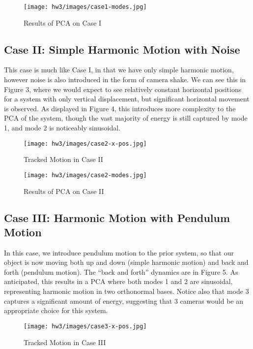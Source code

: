 \documentclass[a4paper,10 pt]{article}
\begin{document}
\begin{figure}[H]
  \centering
    \texttt{[image: hw3/images/case1-modes.jpg]}
    \caption{Results of PCA on Case I}
\end{figure}

\subsection{Case II: Simple Harmonic Motion with Noise}
This case is much like Case I, in that we have only simple harmonic motion, however noise is also introduced in the form of camera shake. We can see this in Figure 3, where we would expect to see relatively constant horizontal positions for a system with only vertical displacement, but significant horizontal movement is observed. As displayed in Figure 4, this introduces more complexity to the PCA of the system, though the vast majority of energy is still captured by mode 1, and mode 2 is noticeably sinusoidal.

\begin{figure}[H]
  \centering
    \texttt{[image: hw3/images/case2-x-pos.jpg]}
    \caption{Tracked Motion in Case II}
\end{figure}

\begin{figure}[H]
  \centering
    \texttt{[image: hw3/images/case2-modes.jpg]}
    \caption{Results of PCA on Case II}
\end{figure}

\subsection{Case III: Harmonic Motion with Pendulum Motion}
In this case, we introduce pendulum motion to the prior system, so that our object is now moving both up and down (simple harmonic motion) and back and forth (pendulum motion). The ``back and forth'' dynamics are in Figure 5. As anticipated, this results in a PCA where both modes 1 and 2 are sinusoidal, representing harmonic motion in two orthonormal bases. Notice also that mode 3 captures a significant amount of energy, suggesting that 3 cameras would be an appropriate choice for this system.

\begin{figure}[H]
  \centering
    \texttt{[image: hw3/images/case3-x-pos.jpg]}
    \caption{Tracked Motion in Case III}
\end{figure}
\end{document}
